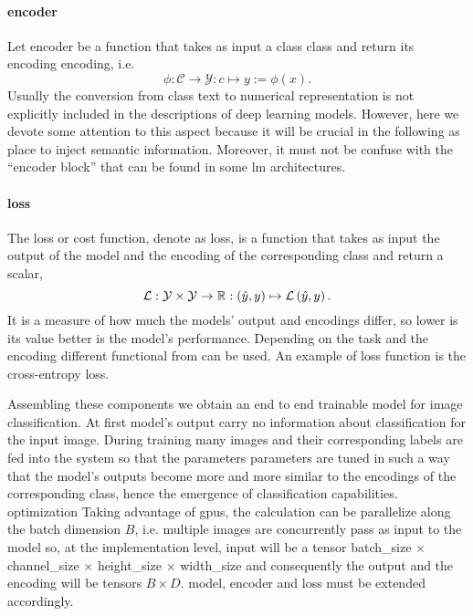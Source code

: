 \paragraph{encoder} Let \gls{encoder} be a function that takes as input a class
\gls{class} and return its encoding \gls{encoding}, i.e.
\begin{equation}
  \phi: \mathcal{C} \to \mathcal{Y} : c \mapsto y := \phi \left(x\right).
  \label{eq:encoder}
\end{equation}
Usually the conversion from class text to numerical representation is not
explicitly included in the descriptions of deep learning models. However, here
we devote some attention to this aspect because it will be crucial in the
following as place to inject semantic information. Moreover, it must not be
confuse with the ``encoder block'' that can be found in some \acrshort{lm}
architectures.

\paragraph{loss} The loss or cost function, denote as \gls{loss}, is a function
that takes as input the output of the model and the encoding of the
corresponding class and return a scalar,
\begin{equation}
  \operatorname{\mathcal{L}}: \mathcal{Y} \times \mathcal{Y} \to \mathbb{R}
       : \left(\hat{y}, y\right) \mapsto \operatorname{\mathcal{L}} \left(\hat{y}, y\right).
  \label{eq:loss}
\end{equation}
It is a measure of how much the models' output and encodings differ, so lower
is its value better is the model's performance. Depending on the task and the
encoding different functional from can be used. An example of loss function is
the cross-entropy loss.

\medskip Assembling these components we obtain an end to end trainable model
for image classification. At first model's output carry no information about
classification for the input image. During training many images and their
corresponding labels are fed into the system so that the parameters
\gls{parameters} are tuned in such a way that the model's outputs become more
and more similar to the encodings of the corresponding class, hence the
emergence of classification capabilities. %
optimization Taking advantage of \acrshort{gpu}s, the calculation can be
parallelize along the batch dimension $B$, i.e. multiple images are
concurrently pass as input to the model so, at the implementation level,
\gls{input} will be a tensor \gls{batch_size} $\times$ \gls{channel_size}
$\times$ \gls{height_size} $\times$ \gls{width_size} and consequently the
output and the encoding will be tensors $B \times D$. \gls{model},
\gls{encoder} and \gls{loss} must be extended accordingly.


